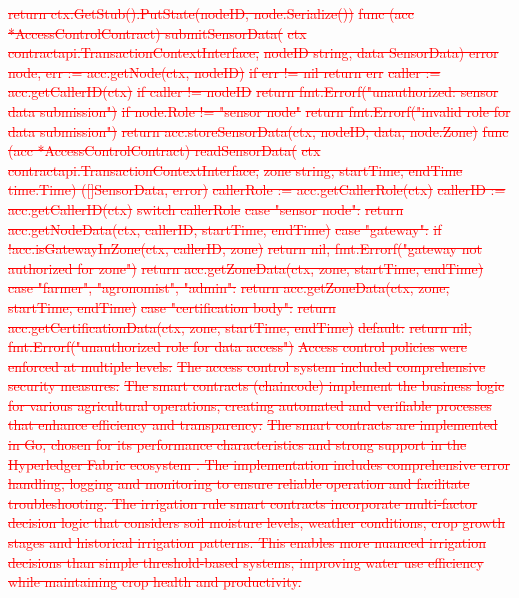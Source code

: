 \documentclass[pdflatex,sn-mathphys-num]{sn-jnl}
\theoremstyle{thmstyleone}
\theoremstyle{thmstyletwo}
\theoremstyle{thmstylethree}
\begin{document}
{\textcolor{red}{\sout{return ctx.GetStub().PutState(nodeID, node.Serialize())}}
\textcolor{red}{\sout{func (acc *AccessControlContract) submitSensorData(}}
\textcolor{red}{\sout{ctx contractapi.TransactionContextInterface,}}
\textcolor{red}{\sout{nodeID string, data SensorData) error}}
\textcolor{red}{\sout{node, err := acc.getNode(ctx, nodeID)}}
\textcolor{red}{\sout{if err != nil return err}}
\textcolor{red}{\sout{caller := acc.getCallerID(ctx)}}
\textcolor{red}{\sout{if caller != nodeID}}
\textcolor{red}{\sout{return fmt.Errorf("unauthorized: sensor data submission")}}
\textcolor{red}{\sout{if node.Role != "sensor node"}}
\textcolor{red}{\sout{return fmt.Errorf("invalid role for data submission")}}
\textcolor{red}{\sout{return acc.storeSensorData(ctx, nodeID, data, node.Zone)}}
\textcolor{red}{\sout{func (acc *AccessControlContract) readSensorData(}}
\textcolor{red}{\sout{ctx contractapi.TransactionContextInterface,}}
\textcolor{red}{\sout{zone string, startTime, endTime time.Time) ([]SensorData, error)}}
\textcolor{red}{\sout{callerRole := acc.getCallerRole(ctx)}}
\textcolor{red}{\sout{callerID := acc.getCallerID(ctx)}}
\textcolor{red}{\sout{switch callerRole}}
\textcolor{red}{\sout{case "sensor node":}}
\textcolor{red}{\sout{return acc.getNodeData(ctx, callerID, startTime, endTime)}}
\textcolor{red}{\sout{case "gateway":}}
\textcolor{red}{\sout{if !acc.isGatewayInZone(ctx, callerID, zone)}}
\textcolor{red}{\sout{return nil, fmt.Errorf("gateway not authorized for zone")}}
\textcolor{red}{\sout{return acc.getZoneData(ctx, zone, startTime, endTime)}}
\textcolor{red}{\sout{case "farmer", "agronomist", "admin":}}
\textcolor{red}{\sout{return acc.getZoneData(ctx, zone, startTime, endTime)}}
\textcolor{red}{\sout{case "certification body":}}
\textcolor{red}{\sout{return acc.getCertificationData(ctx, zone, startTime, endTime)}}
\textcolor{red}{\sout{default:}}
\textcolor{red}{\sout{return nil, fmt.Errorf("unauthorized role for data access")}}
\textcolor{red}{\sout{Access control policies were enforced at multiple levels:}}
\textcolor{red}{\sout{The access control system included comprehensive security measures:}}
\textcolor{red}{\sout{The smart contracts (chaincode) implement the business logic for various agricultural operations, creating automated and verifiable processes that enhance efficiency and transparency:}}
\textcolor{red}{\sout{The smart contracts are implemented in Go, chosen for its performance characteristics and strong support in the Hyperledger Fabric ecosystem . The implementation includes comprehensive error handling, logging and monitoring to ensure reliable operation and facilitate troubleshooting. The irrigation rule smart contracts incorporate multi-factor decision logic that considers soil moisture levels, weather conditions, crop growth stages and historical irrigation patterns. This enables more nuanced irrigation decisions than simple threshold-based systems, improving water use efficiency while maintaining crop health and productivity.}}
}
\end{document}
